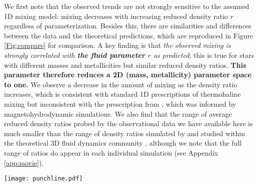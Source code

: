 We first note that the observed trends are not strongly sensitive to the assumed 1D mixing model: mixing decreases with increasing reduced density ratio $r$ regardless of parameterization.
%
Besides this, there are similarities and differences between the data and the theoretical predictions, which are reproduced in Figure \ref{Fig:compare} for comparison. A key finding is that \textit{the observed mixing is strongly correlated with \textbf{the fluid parameter $r$} as predicted}; this is true for stars with different masses and metallicities but similar reduced density ratios.
\textbf{This parameter therefore reduces a 2D (mass, metallicity) parameter space to one.}
We observe a decrease in the amount of mixing as the density ratio increases, which is consistent with standard 1D prescriptions of thermohaline mixing but inconsistent with the prescription from \citet{harrington}, which was informed by magnetohydrodynamic simulations. 
We also find that the range of average reduced density ratios probed by the observational data we have available here is much smaller than the range of density ratios simulated by and studied within the theoretical 3D fluid dynamics community \citep[e.g.][]{brown_etal_2013}, although we note that the full range of ratios do appear in each individual simulation (see Appendix \ref{app:movie}).

\begin{figure*}[!tb]
\begin{center}
\texttt{[image: punchline.pdf]}
\caption{\textbf{Left:} A reproduction of Figure \ref{fig:parameterization_compare} showing the predicted rate of mixing versus the reduced density ratio in various prescriptions of thermohaline mixing, including hydrodynamic (orange, green) and magnetohydrodynamic (purple) models. \textbf{Right:} The observed extra mixing near the red giant branch bump as a function of the reduced density ratio inferred from one dimensional stellar evolution models. While the conversion from the change in a mixing diagnostic to the fluid mixing rate is not trivial, and therefore we do not attempt it here, we note that the observed mixing amounts are strongly negatively correlated with $r$, with stars probing on average a relatively narrow range of the regime formally unstable to thermohaline mixing. }
\label{Fig:compare}
\end{center}
\end{figure*}


